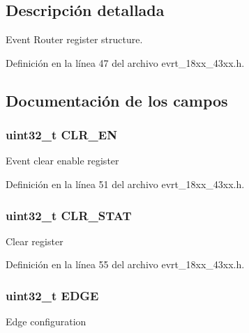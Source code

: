 \subsection{Descripción detallada}
Event Router register structure. 

Definición en la línea 47 del archivo evrt\+\_\+18xx\+\_\+43xx.\+h.



\subsection{Documentación de los campos}
\subsubsection[{\texorpdfstring{C\+L\+R\+\_\+\+EN}{CLR_EN}}]{ uint32\+\_\+t C\+L\+R\+\_\+\+EN}\hypertarget{struct_l_p_c___e_v_r_t___t_a0d317a6488644b87e17e5f559c08289f}{}\label{struct_l_p_c___e_v_r_t___t_a0d317a6488644b87e17e5f559c08289f}
Event clear enable register 

Definición en la línea 51 del archivo evrt\+\_\+18xx\+\_\+43xx.\+h.

\subsubsection[{\texorpdfstring{C\+L\+R\+\_\+\+S\+T\+AT}{CLR_STAT}}]{ uint32\+\_\+t C\+L\+R\+\_\+\+S\+T\+AT}\hypertarget{struct_l_p_c___e_v_r_t___t_a2736f94695ea3082afc55537cc4172b4}{}\label{struct_l_p_c___e_v_r_t___t_a2736f94695ea3082afc55537cc4172b4}
Clear register 

Definición en la línea 55 del archivo evrt\+\_\+18xx\+\_\+43xx.\+h.

\subsubsection[{\texorpdfstring{E\+D\+GE}{EDGE}}]{ uint32\+\_\+t E\+D\+GE}\hypertarget{struct_l_p_c___e_v_r_t___t_afc78c9d3a56c3f7e8c47affdf245df6b}{}\label{struct_l_p_c___e_v_r_t___t_afc78c9d3a56c3f7e8c47affdf245df6b}
Edge configuration 

